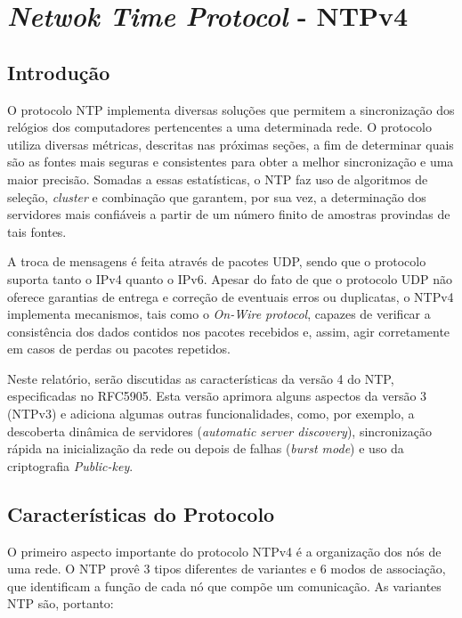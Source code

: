 \section {\textit{Netwok Time Protocol} - NTPv4}

\subsection {Introdução}

O protocolo NTP implementa diversas soluções que permitem a sincronização dos
relógios dos computadores pertencentes a uma determinada rede. O protocolo
utiliza diversas métricas, descritas nas próximas seções, a fim de determinar
quais são as fontes mais seguras e consistentes para obter a melhor
sincronização e uma maior precisão. Somadas a essas estatísticas, o NTP faz uso
de algoritmos de seleção, \textit{cluster} e combinação que garantem, por sua
vez, a determinação dos servidores mais confiáveis a partir de um número finito
de amostras provindas de tais fontes. 

\vspace{12pt}

A troca de mensagens é feita através de pacotes UDP, sendo que o protocolo
suporta tanto o IPv4 quanto o IPv6. Apesar do fato de que o protocolo UDP não
oferece garantias de entrega e correção de eventuais erros ou duplicatas, o
NTPv4 implementa mecanismos, tais como o \textit{On-Wire protocol}, capazes de
verificar a consistência dos dados contidos nos pacotes recebidos e, assim,
agir corretamente em casos de perdas ou pacotes repetidos.

\vspace{12pt}

Neste relatório, serão discutidas as características da versão 4 do NTP,
especificadas no RFC5905. Esta versão aprimora alguns aspectos da versão 3
(NTPv3) e adiciona algumas outras funcionalidades, como, por exemplo, a
descoberta dinâmica de servidores (\textit{automatic server discovery}),
sincronização rápida na inicialização da rede ou depois de falhas
(\textit{burst mode}) e uso da criptografia \textit{Public-key}.

\subsection {Características do Protocolo}

O primeiro aspecto importante do protocolo NTPv4 é a organização dos
nós de uma rede. O NTP provê 3 tipos diferentes de variantes 
e 6 modos de associação, que identificam a função de cada nó que
compõe um comunicação. As variantes NTP são, portanto:

